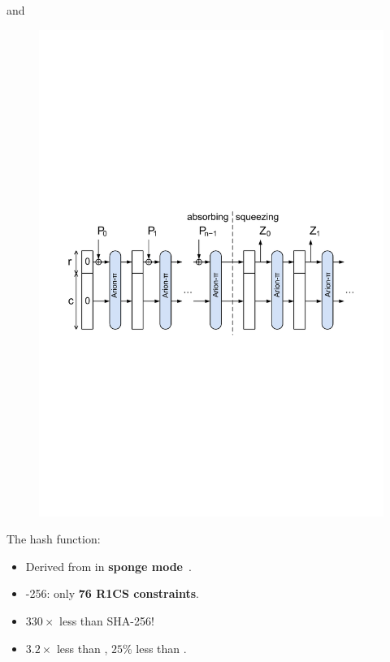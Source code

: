 \documentclass[beamer={10pt,xcolor=dvipsnames},target=mst]{thud}
\begin{document}
\begin{frame}{\Arionhash{} and \Aarionhash{}}
  \begin{figure}
    \centering
    \includegraphics[scale=0.5]{res/SpongeConstruction.pdf}
  \end{figure}

  The \Arionhash{} hash function:
  \begin{itemize}
    \item Derived from \Arionp{} in \textbf{sponge mode}~\cite{BertoniDPA2007}.
    \item \Arionhash{}-256: only \textbf{76 R1CS constraints}.
    \item \(330\times \) less than SHA-256!
    \item \(3.2\times \) less than \Poseidon{}, \(25\% \) less than \Griffin{}.
  \end{itemize}
\end{frame}
\end{document}
